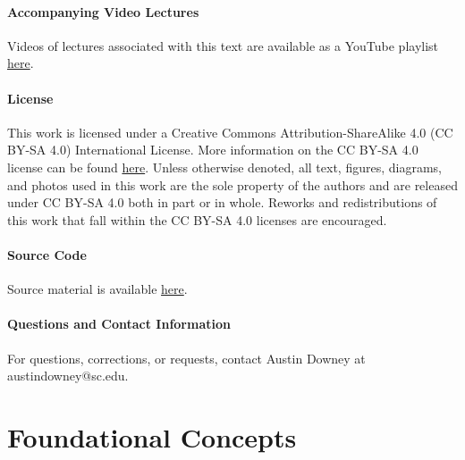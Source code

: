 \documentclass[12pt,letter]{article}
\begin{document}
\vspace{-1ex}
\subsection{Accompanying Video Lectures}
\vspace{-1ex}
Videos of lectures associated with this text are available as a YouTube playlist 
\href{https://www.youtube.com/playlist?list=PL-2wJog-EC58uXz1LhpNRmV8nCEvyvoVS}{here}.

\vspace{-1ex}
\subsection{License}
\vspace{-1ex}
This work is licensed under a Creative Commons Attribution-ShareAlike 4.0 (CC BY-SA 4.0) International License. More information on the CC BY-SA 4.0 license can be found  \href{https://creativecommons.org/licenses/by-sa/4.0/}{here}. Unless otherwise denoted, all text, figures, diagrams, and photos used in this work are the sole property of the authors and are released under CC BY-SA 4.0 both in part or in whole. Reworks and redistributions of this work that fall within the CC BY-SA 4.0 licenses are encouraged.

\vspace{-1ex}
\subsection{Source Code}
\vspace{-1ex}
Source material is available \href{https://github.com/austindowney/Vibration-Mechanics}{here}.

\vspace{-1ex}
\subsection{Questions and Contact Information}
\vspace{-1ex}
For questions, corrections, or requests, contact Austin Downey at austindowney@sc.edu.



%
\pagebreak

%
%

\setcounter{page}{0}

\part{Foundational Concepts}
\end{document}
